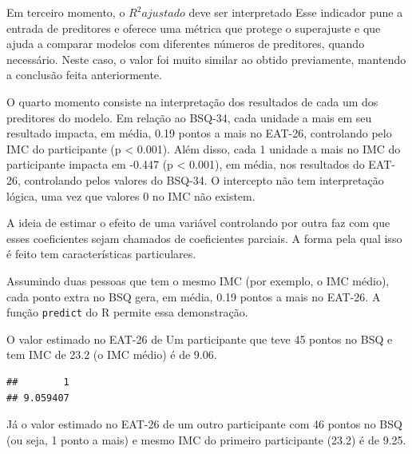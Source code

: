 \documentclass[
]{book}
\newenvironment{Shaded}{\begin{snugshade}}{\end{snugshade}}
\newcommand{\AttributeTok}[1]{\textcolor[rgb]{0.77,0.63,0.00}{#1}}
\newcommand{\DecValTok}[1]{\textcolor[rgb]{0.00,0.00,0.81}{#1}}
\newcommand{\FunctionTok}[1]{\textcolor[rgb]{0.00,0.00,0.00}{#1}}
\newcommand{\NormalTok}[1]{#1}
\newcommand{\OtherTok}[1]{\textcolor[rgb]{0.56,0.35,0.01}{#1}}
\newcommand{\SpecialCharTok}[1]{\textcolor[rgb]{0.00,0.00,0.00}{#1}}
\begin{document}
Em terceiro momento, o \(R^2 ajustado\) deve ser interpretado Esse indicador pune a entrada de preditores e oferece uma métrica que protege o superajuste e que ajuda a comparar modelos com diferentes números de preditores, quando necessário. Neste caso, o valor foi muito similar ao obtido previamente, mantendo a conclusão feita anteriormente.

O quarto momento consiste na interpretação dos resultados de cada um dos preditores do modelo. Em relação ao BSQ-34, cada unidade a mais em seu resultado impacta, em média, 0.19 pontos a mais no EAT-26, controlando pelo IMC do participante (p \textless{} 0.001). Além disso, cada 1 unidade a mais no IMC do participante impacta em -0.447 (p \textless{} 0.001), em média, nos resultados do EAT-26, controlando pelos valores do BSQ-34. O intercepto não tem interpretação lógica, uma vez que valores 0 no IMC não existem.

A ideia de estimar o efeito de uma variável controlando por outra faz com que esses coeficientes sejam chamados de coeficientes parciais. A forma pela qual isso é feito tem características particulares.

Assumindo duas pessoas que tem o mesmo IMC (por exemplo, o IMC médio), cada ponto extra no BSQ gera, em média, 0.19 pontos a mais no EAT-26. A função \texttt{predict} do R permite essa demonstração.

O valor estimado no EAT-26 de Um participante que teve 45 pontos no BSQ e tem IMC de 23.2 (o IMC médio) é de 9.06.

\begin{Shaded}
\end{Shaded}

\begin{verbatim}
##        1 
## 9.059407
\end{verbatim}

Já o valor estimado no EAT-26 de um outro participante com 46 pontos no BSQ (ou seja, 1 ponto a mais) e mesmo IMC do primeiro participante (23.2) é de 9.25.
\end{document}
